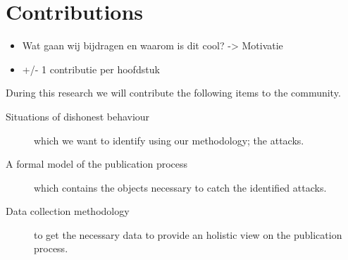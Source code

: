 \documentclass{ou-report}
\newcommand{\outline}[1]{{\color{blue} #1}}
\begin{document}
\section{Contributions}
\outline{
\begin{itemize}
    \item Wat gaan wij bijdragen en waarom is dit cool? -> Motivatie
    \item +/- 1 contributie per hoofdstuk
\end{itemize}
}
During this research we will contribute the following items to the community.
\begin{description}
    \item[Situations of dishonest behaviour] which we want to identify using our 
        methodology; the attacks.
    \item[A formal model of the publication process] which contains the objects 
        necessary to catch the identified attacks.
    \item[Data collection methodology] to get the necessary data to provide an 
        holistic view on the publication process.
\end{description}
\end{document}
